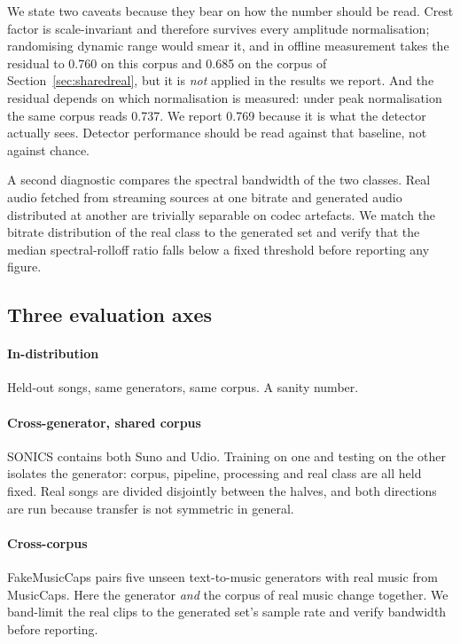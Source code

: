 We state two caveats because they bear on how the number should be read. Crest
factor is scale-invariant and therefore survives every amplitude normalisation;
randomising dynamic range would smear it, and in offline measurement takes the
residual to 0.760 on this corpus and 0.685 on the corpus of
Section~\ref{sec:sharedreal}, but it is \emph{not} applied in the results we
report. And the residual depends on which normalisation is measured: under peak
normalisation the same corpus reads 0.737. We report 0.769 because it is what
the detector actually sees. Detector performance should be read against that
baseline, not against chance.

A second diagnostic compares the spectral bandwidth of the two classes. Real
audio fetched from streaming sources at one bitrate and generated audio
distributed at another are trivially separable on codec artefacts. We match the
bitrate distribution of the real class to the generated set and verify that the
median spectral-rolloff ratio falls below a fixed threshold before reporting any
figure.

\subsection{Three evaluation axes}

\paragraph{In-distribution}
Held-out songs, same generators, same corpus. A sanity number.

\paragraph{Cross-generator, shared corpus}
SONICS contains both Suno and Udio. Training on one and testing on the other
isolates the generator: corpus, pipeline, processing and real class are all held
fixed. Real songs are divided disjointly between the halves, and both directions
are run because transfer is not symmetric in general.

\paragraph{Cross-corpus}
FakeMusicCaps pairs five unseen text-to-music generators with real music from
MusicCaps. Here the generator \emph{and} the corpus of real music change
together. We band-limit the real clips to the generated set's sample rate and
verify bandwidth before reporting.

